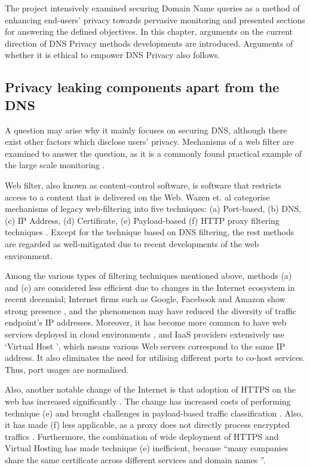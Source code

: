 The project intensively examined securing Domain Name queries as a method of enhancing end-users' privacy towards pervasive monitoring and presented sections for answering the defined objectives. In this chapter, arguments on the current direction of DNS Privacy methods developments are introduced. Arguments of whether it is ethical to empower DNS Privacy also follows.

\subsection{Privacy leaking components apart from the DNS}
A question may arise why it mainly focuses on securing DNS, although there exist other factors which disclose users' privacy.
Mechanisms of a web filter are examined to answer the question, as it is a commonly found practical example of the large scale monitoring \cite{murdoch2008tools}.

Web filter, also known as content-control software, is software that restricts access to a content that is delivered on the Web.
Wazen et. al categorise mechanisms of legacy web-filtering into five techniques: (a) Port-based, (b) DNS, (c) IP Address, (d) Certificate, (e) Payload-based (f) HTTP proxy filtering techniques \cite{shbair2015efficiently}.
Except for the technique based on DNS filtering, the rest methods are regarded as well-mitigated due to recent developments of the web environment. 

Among the various types of filtering techniques mentioned above, methods (a) and (c) are considered less efficient due to changes in the Internet ecosystem in recent decennial;
Internet firms such as Google, Facebook and Amazon show strong presence \cite{haucap2014google}, and the phenomenon may have reduced the diversity of traffic endpoint's IP addresses.
Moreover, it has become more common to have web services deployed in cloud environments \cite{clouds2018stat}, and IaaS providers extensively use `Virtual Host \cite{virtual24host}', which means various Web servers correspond to the same IP address.
It also eliminates the need for utilising different ports to co-host services. Thus, port usages are normalised.

Also, another notable change of the Internet is that adoption of HTTPS on the web has increased significantly \cite{felt2017measuring}.
The change has increased costs of performing technique (e) and brought challenges in payload-based traffic classification \cite{xue2013traffic}.
Also, it has made (f) less applicable, as a proxy does not directly process encrypted traffics \cite{shbair2015efficiently}.
Furthermore, the combination of wide deployment of HTTPS and Virtual Hosting has made technique (e) inefficient, because ``many companies share the same certificate across different services and domain names \cite{shbair2015efficiently}''.


